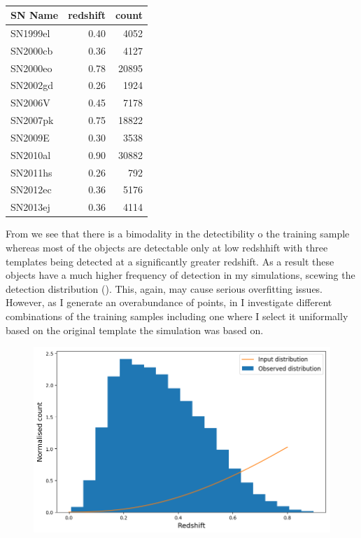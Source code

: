 \begin{table}
  \caption{}
  \label{tab:SNIITemplates}
  \centering
  \begin{tabular}{l|r|r}
    SN Name  & redshift & count \\
    \hline
    SN1999el & 0.40 &  4052 \\
    SN2000cb & 0.36 &  4127 \\
    SN2000eo & 0.78 & 20895 \\
    SN2002gd & 0.26 &  1924 \\
    SN2006V  & 0.45 &  7178 \\
    SN2007pk & 0.75 & 18822 \\
    SN2009E  & 0.30 &  3538 \\
    SN2010al & 0.90 & 30882 \\
    SN2011hs & 0.26 &   792 \\
    SN2012ec & 0.36 &  5176 \\
    SN2013ej & 0.36 &  4114 \\
    \hline
  \end{tabular}
\end{table}

From  we see that there is a bimodality in the detectibility o the training sample whereas most of the objects are detectable only at low redshhift with three templates being detected at a significantly greater redshift. As a result these objects have a much higher frequency of detection in my simulations, scewing the detection distribution (). This, again, may cause serious overfitting issues. However, as I generate an overabundance of points, in  I investigate different combinations of the training samples including one where I select it uniformally based on the original template the simulation was based on.

\begin{figure}
  \includegraphics[width=\textwidth]{Figures/Chapter5/SNII_z_dist.png}
  \caption{}
  \label{fig:IIDist}
\end{figure}

